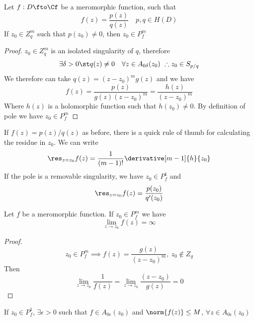 \documentclass[../mmf.tex]{subfiles}
\begin{document}
\begin{thm}
	Let $f:D\fto\Cf$ be a meromorphic function, such that
	\begin{equation*}
		f(z)=\frac{p(z)}{q(z)}\quad p,q\in H(D)
	\end{equation*}
	If $z_0\in Z_q^m$ such that $p(z_0)\ne0$, then $z_0\in P^m_f$
\end{thm}
\begin{proof}
	$z_0\in Z_q^m$ is an isolated singularity of $q$, therefore
	\begin{equation*}
		\exists\delta>0\st q(z)\ne0\quad\forall z\in A_{0\delta}(z_0)\ \therefore z_0\in S_{p/q}
	\end{equation*}
	We therefore can take $q(z)=(z-z_0)^mg(z)$ and we have
	\begin{equation*}
		f(z)=\frac{p(z)}{g(z)(z-z_0)^m}=\frac{h(z)}{(z-z_0)^m}
	\end{equation*}
	Where $h(z)$ is a holomorphic function such that $h(z_0)\ne0$. By definition of pole we have $z_0\in P^m_f$
\end{proof}
\begin{thm}
	If $f(z)=p(z)/q(z)$ as before, there is a quick rule of thumb for calculating the residue in $z_0$. We can write
	\begin{equation*}
		\res_{z=z_0}f(z)=\frac{1}{(m-1)!}\derivative[m-1]{h}{z_0}
	\end{equation*}
	If the pole is a removable singularity, we have $z_0\in P^1_f$ and
	\begin{equation*}
		\res_{z=z_0}f(z)=\frac{p(z_0)}{q'(z_0)}
	\end{equation*}
\end{thm}
\begin{thm}
	Let $f$ be a meromorphic function. If $z_0\in P^m_f$ we have
	\begin{equation*}
		\lim_{z\to z_0}f(z)=\infty
	\end{equation*}
\end{thm}
\begin{proof}
	\begin{equation*}
		z_0\in P^m_f\implies{} f(z)=\frac{g(z)}{(z-z_0)^m},\ z_0\notin Z_g
	\end{equation*}
	Then
	\begin{equation*}
		\lim_{z\to z_0}\frac{1}{f(z)}=\lim_{z\to z_0}\frac{(z-z_0)}{g(z)}=0
	\end{equation*}
\end{proof}
\begin{thm}
	If $z_0\in P^1_f$, $\exists\epsilon>0$ such that $f\in A_{0\epsilon}(z_0)$ and $\norm{f(z)}\le M$, $\forall z\in A_{0\epsilon}(z_0)$
\end{thm}
\end{document}
